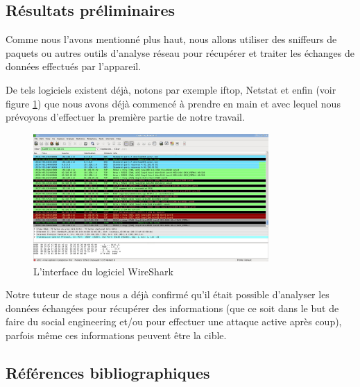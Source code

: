 \documentclass[a4paper, 12pt,twoside]{article}
\begin{document}
		\subsection{Résultats préliminaires}

		Comme nous l'avons mentionné plus haut, nous allons utiliser des sniffeurs de paquets ou autres outils d'analyse réseau pour récupérer et traiter les échanges de données effectués par l'appareil.
		
		De tels logiciels existent déjà, notons par exemple iftop, Netstat et enfin \wireshark{} (voir figure \ref{pic:wireshark}) que nous avons déjà commencé à prendre en main et avec lequel nous prévoyons d'effectuer la première partie de notre travail.
		
		\begin{figure}[!ht]
		\centering
		\includegraphics[width=0.8\textwidth]{wireshark.jpg}
		\caption{L'interface du logiciel WireShark}
		\label{pic:wireshark}
		\end{figure}
		
		Notre tuteur de stage nous a déjà confirmé qu'il était possible d'analyser les données échangées pour récupérer des informations (que ce soit dans le but de faire du social engineering et/ou pour effectuer une attaque active après coup), parfois même ces informations peuvent être la cible.
		
		\clearpage %
		\subsection{Références bibliographiques}
		{
		\renewcommand{\section}[2]{} %
		\nocite{*}
		
		
		}
\end{document}
